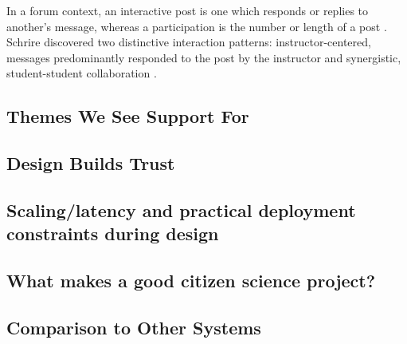 \documentclass{sigchi}
\begin{document}
In a forum context, an interactive post is one which responds or replies to another's message, whereas a participation is the number or length of a post \cite{schrire2006knowledge}. 
Schrire discovered two distinctive interaction patterns: instructor-centered, messages predominantly responded to the post by the instructor and synergistic, student-student collaboration \cite{schrire2006knowledge}. 

\subsection{Themes We See Support For}
\subsection{Design Builds Trust}
\subsection{Scaling/latency and practical deployment constraints during design}
\subsection{What makes a good citizen science project?}
\subsection{Comparison to Other Systems}


\end{document}
